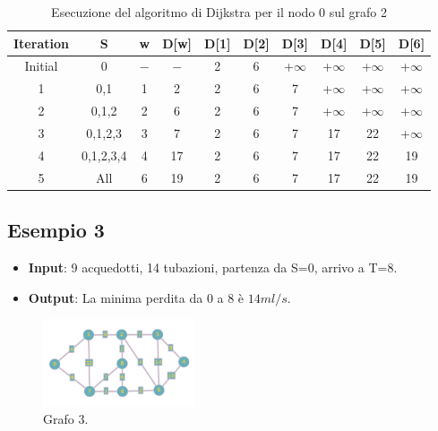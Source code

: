 \documentclass[a4paper,12pt]{article}
\begin{document}
\begin{table}[H]
    \centering
    \begin{tabular}{cccccccccc}
        \toprule
        \textbf{Iteration} & \textbf{S} & \textbf{w} & \textbf{D[w]} &
        \textbf{D[1]} & \textbf{D[2]} & \textbf{D[3]} & \textbf{D[4]} &
        \textbf{D[5]} & \textbf{D[6]} \\
        \midrule
        Initial & 0 & $-$ & $-$ & 2 & 6 & +$\infty$ & +$\infty$ & +$\infty$ & +$\infty$ \\
        1 & {0,1} & 1 & 2 & 2 & 6 & 7 & +$\infty$ & +$\infty$ & +$\infty$ \\
        2 & {0,1,2} & 2 & 6 & 2 & 6 & 7 & +$\infty$ & +$\infty$ & +$\infty$ \\
        3 & {0,1,2,3} & 3 & 7 & 2 & 6 & 7 & 17 & 22 & +$\infty$ \\
        4 & {0,1,2,3,4} & 4 & 17 & 2 & 6 & 7 & 17 & 22 & 19 \\
        5 & All & 6 & 19 & 2 & 6 & 7 & 17 & 22 & 19 \\
        \bottomrule
    \end{tabular}
    \caption{Esecuzione del algoritmo di Dijkstra per il nodo 0 sul grafo 2}
\end{table}

\clearpage
\subsection{Esempio 3}
\begin{itemize}
    \item \textbf{Input}: 9 acquedotti, 14 tubazioni, partenza da S=0, arrivo a T=8.
    \item \textbf{Output}: La minima perdita da 0 a 8 è $14ml/s$.
\end{itemize}

\begin{figure}[h!]
    \centering
    \includegraphics[width=0.4\textwidth]{Images/graph3.png}
    \caption{Grafo 3.}\label{fig:grafo3}
\end{figure}
\end{document}
